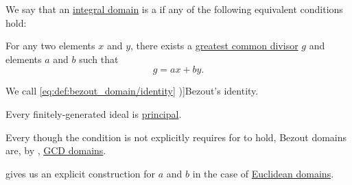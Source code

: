 \begin{definition}\label{def:bezout_domain}
  We say that an \hyperref[def:integral_domain]{integral domain} is a  if any of the following equivalent conditions hold:
  \begin{thmenum}
     For any two elements \( x \) and \( y \), there exists a \hyperref[def:gcd]{greatest common divisor} \( g \) and elements \( a \) and \( b \) such that
    \begin{equation}\label{eq:def:bezout_domain/identity}
      g = ax + by.
    \end{equation}

    We call \eqref{eq:def:bezout_domain/identity} \term[en=Bezout's identity (\cite[3]{Knapp2016BasicAlgebra})]{Bezout's identity}.

     Every finitely-generated ideal is \hyperref[def:semiring_ideal/principal]{principal}.
  \end{thmenum}
\end{definition}
\begin{comments}
  \item Every though the condition is not explicitly requires for  to hold, Bezout domains are, by , \hyperref[def:gcd_domain]{GCD domains}.
  \item {} gives us an explicit construction for \( a \) and \( b \) in the case of \hyperref[def:euclidean_domain]{Euclidean domains}.
\end{comments}
